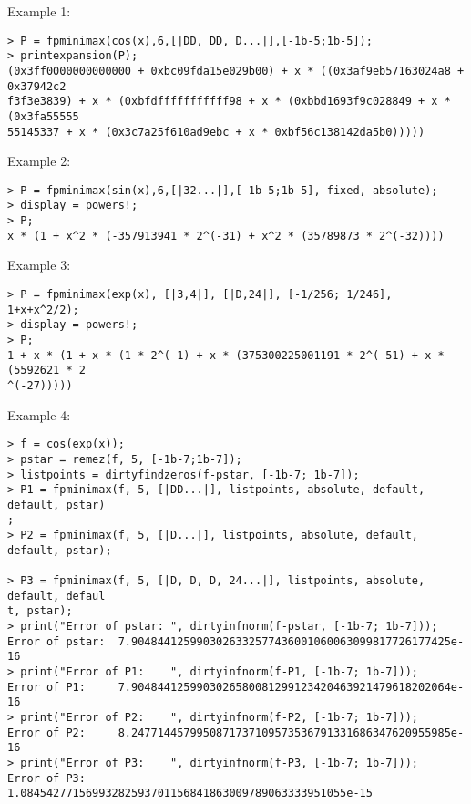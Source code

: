 \noindent Example 1: 
\begin{center}\begin{minipage}{15cm}\begin{Verbatim}[frame=single]
> P = fpminimax(cos(x),6,[|DD, DD, D...|],[-1b-5;1b-5]);
> printexpansion(P);
(0x3ff0000000000000 + 0xbc09fda15e029b00) + x * ((0x3af9eb57163024a8 + 0x37942c2
f3f3e3839) + x * (0xbfdfffffffffff98 + x * (0xbbd1693f9c028849 + x * (0x3fa55555
55145337 + x * (0x3c7a25f610ad9ebc + x * 0xbf56c138142da5b0)))))
\end{Verbatim}
\end{minipage}\end{center}
\noindent Example 2: 
\begin{center}\begin{minipage}{15cm}\begin{Verbatim}[frame=single]
> P = fpminimax(sin(x),6,[|32...|],[-1b-5;1b-5], fixed, absolute);
> display = powers!;
> P;
x * (1 + x^2 * (-357913941 * 2^(-31) + x^2 * (35789873 * 2^(-32))))
\end{Verbatim}
\end{minipage}\end{center}
\noindent Example 3: 
\begin{center}\begin{minipage}{15cm}\begin{Verbatim}[frame=single]
> P = fpminimax(exp(x), [|3,4|], [|D,24|], [-1/256; 1/246], 1+x+x^2/2);
> display = powers!;
> P;
1 + x * (1 + x * (1 * 2^(-1) + x * (375300225001191 * 2^(-51) + x * (5592621 * 2
^(-27)))))
\end{Verbatim}
\end{minipage}\end{center}
\noindent Example 4: 
\begin{center}\begin{minipage}{15cm}\begin{Verbatim}[frame=single]
> f = cos(exp(x));
> pstar = remez(f, 5, [-1b-7;1b-7]);
> listpoints = dirtyfindzeros(f-pstar, [-1b-7; 1b-7]);
> P1 = fpminimax(f, 5, [|DD...|], listpoints, absolute, default, default, pstar)
;
> P2 = fpminimax(f, 5, [|D...|], listpoints, absolute, default, default, pstar);

> P3 = fpminimax(f, 5, [|D, D, D, 24...|], listpoints, absolute, default, defaul
t, pstar);
> print("Error of pstar: ", dirtyinfnorm(f-pstar, [-1b-7; 1b-7]));
Error of pstar:  7.9048441259903026332577436001060063099817726177425e-16
> print("Error of P1:    ", dirtyinfnorm(f-P1, [-1b-7; 1b-7]));
Error of P1:     7.9048441259903026580081299123420463921479618202064e-16
> print("Error of P2:    ", dirtyinfnorm(f-P2, [-1b-7; 1b-7]));
Error of P2:     8.2477144579950871737109573536791331686347620955985e-16
> print("Error of P3:    ", dirtyinfnorm(f-P3, [-1b-7; 1b-7]));
Error of P3:     1.08454277156993282593701156841863009789063333951055e-15
\end{Verbatim}
\end{minipage}\end{center}
